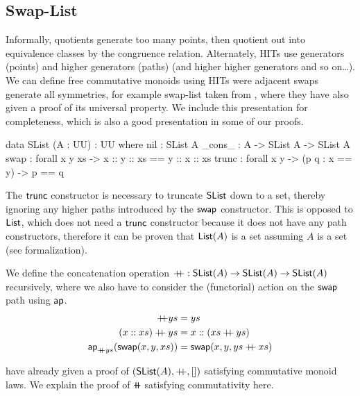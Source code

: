\subsection{Swap-List}\label{cmon:slist}

Informally, quotients generate too many points, then quotient out into equivalence classes by the congruence relation.
%
Alternately, HITs use generators (points) and higher generators (paths) (and higher higher generators and so on\ldots).
%
We can define free commutative monoids using HITs were adjacent swaps generate all symmetries,
for example swap-list taken from \cite{choudhuryFreeCommutativeMonoids2023}, where they have also given a proof of its
universal property. We include this presentation for completeness, which is also a good presentation in some of our
proofs.

\begin{code}
data SList (A : UU) : UU where
  nil : SList A
  _cons_ : A -> SList A -> SList A
  swap : forall x y xs -> x :: y :: xs == y :: x :: xs
  trunc : forall x y -> (p q : x == y) -> p == q
\end{code}


The $\operatorname{\mathsf{trunc}}$ constructor is necessary to truncate $\operatorname{\mathsf{SList}}$ down to a set,
thereby ignoring any higher paths introduced by the $\operatorname{\mathsf{swap}}$ constructor.
This is opposed to $\operatorname{\mathsf{List}}$, which does not need a $\operatorname{\mathsf{trunc}}$ constructor
because it does not have any path constructors, therefore it can be proven that $\operatorname{\mathsf{List}}(A)$
is a set assuming $A$ is a set (see formalization).

\begin{definition}[Concatenation]
    We define the concatenation operation $\mathbin{+\kern -0.4em+} : \operatorname{\mathsf{SList}}(A) \to \operatorname{\mathsf{SList}}(A) \to \operatorname{\mathsf{SList}}(A)$
    recursively, where we also have to consider the (functorial) action on the $\operatorname{\mathsf{swap}}$ path using $\operatorname{\mathsf{ap}}$.
    \begin{align*}
        [] \doubleplus ys                                 & = ys                                   \\
        (x :: xs) \doubleplus ys                          & = x :: (xs \doubleplus ys)             \\
        \term{ap}_{\doubleplus ys}(\term{swap}(x, y, xs)) & = \term{swap}(x, y, ys \doubleplus xs)
    \end{align*}
\end{definition}

\cite{choudhuryFreeCommutativeMonoids2023} have already given a proof of $(\operatorname{\mathsf{SList}}(A), \mathbin{+\kern -0.4em+}, [])$ satisfying
commutative monoid laws. We explain the proof of $\doubleplus$ satisfying commutativity here.

